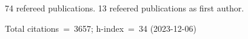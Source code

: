 74 refereed publications. 13 refeered publications as first author.

Total citations~=~3657; h-index~=~34 (2023-12-06)